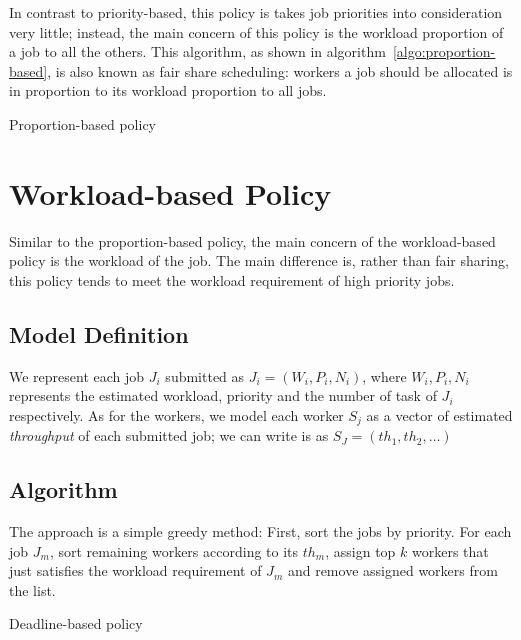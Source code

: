 In contrast to priority-based, this policy is takes job priorities into
consideration very little; instead, the main concern of this policy is
the workload proportion of a job to all the others.
This algorithm, as shown in algorithm~\ref{algo:proportion-based}, is
also known as fair share scheduling: workers a job should be allocated
is in proportion to its workload proportion to all jobs. 

\begin{algorithm}[H]
  \DontPrintSemicolon %
  
  \caption{Proportion-based policy}
  \label{algo:proportion-based}
\end{algorithm}

\section{Workload-based Policy}

Similar to the proportion-based policy, the main concern of the
workload-based policy is the workload of the job.
The main difference is, rather than fair sharing, this policy tends to
meet the workload requirement of high priority jobs.

\subsection{Model Definition}

We represent each job $J_i$ submitted as $J_i = (W_i, P_i, N_i)$, where
$W_i, P_i, N_i$ represents the estimated workload, priority and the
number of task of $J_i$ respectively.
As for the workers, we model each worker $S_j$ as a vector of estimated
\emph{throughput} of each submitted job; we can write is as $S_J =
(th_1, th_2, \ldots)$


\subsection{Algorithm}

The approach is a simple greedy method:
First, sort the jobs by priority.
For each job $J_m$, sort remaining workers according to its $th_m$,
assign top $k$ workers that just satisfies the workload requirement of
$J_m$ and remove assigned workers from the list.

\begin{algorithm}[H]
  \DontPrintSemicolon %
  
  \caption{Deadline-based policy}
  \label{algo:deadline-based}
\end{algorithm}

